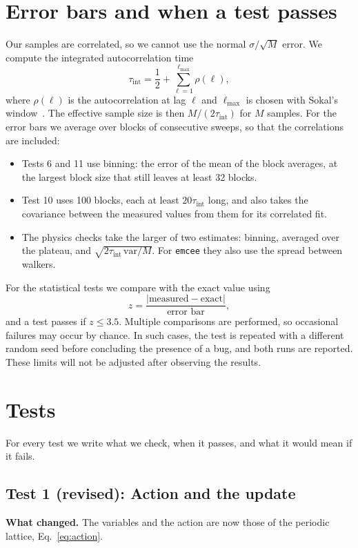 \documentclass[11pt]{article}
\begin{document}
\section{Error bars and when a test passes}
Our samples are correlated, so we cannot use the normal $\sigma/\sqrt{M}$ error. We compute the integrated autocorrelation time
\begin{equation}
  \tau_{\text{int}} = \frac12 + \sum_{\ell=1}^{\ell_{\max}} \rho(\ell),
\end{equation}
where $\rho(\ell)$ is the autocorrelation at lag $\ell$ and $\ell_{\max}$ is chosen with Sokal's window~\cite{sokal}. The effective sample size is then $M/(2\tau_{\text{int}})$ for $M$ samples. For the error bars we average over blocks of consecutive sweeps, so that the correlations are included:
\begin{itemize}
  \item Tests 6 and 11 use binning: the error of the mean of the block averages, at the largest block size that still leaves at least 32 blocks.
  \item Test 10 uses 100 blocks, each at least $20\tau_{\text{int}}$ long, and also takes the covariance between the measured values from them for its correlated fit.
  \item The physics checks take the larger of two estimates: binning, averaged over the plateau, and $\sqrt{2\tau_{\text{int}}\,\mathrm{var}/M}$. For \texttt{emcee} they also use the spread between walkers.
\end{itemize}

For the statistical tests we compare with the exact value using
\begin{equation}
  z = \frac{|\text{measured} - \text{exact}|}{\text{error bar}},
\end{equation}
and a test passes if $z \le 3.5$. Multiple comparisons are performed, so occasional failures may occur by chance. In such cases, the test is repeated with a different random seed before concluding the presence of a bug, and both runs are reported. These limits will not be adjusted after observing the results.

\section{Tests}
For every test we write what we check, when it passes, and what it would mean if it fails.

\subsection*{Test 1 (revised): Action and the update}
\textbf{What changed.} The variables and the action are now those of the periodic lattice, Eq.~\eqref{eq:action}.
\end{document}
